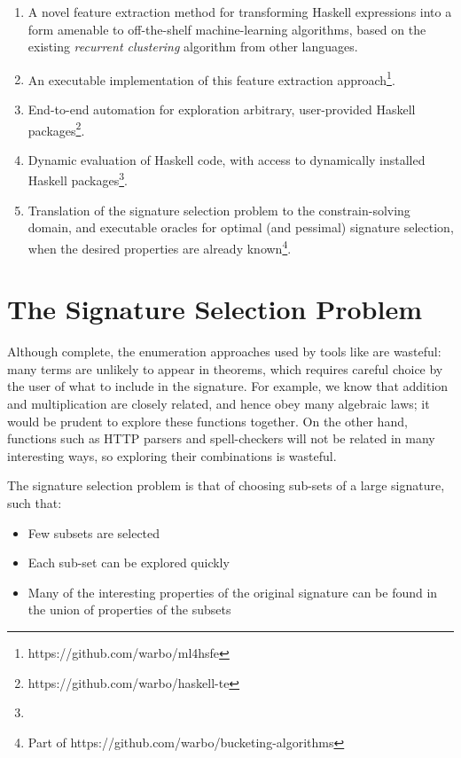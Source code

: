 \begin{enumerate}
\item A novel feature extraction method for transforming Haskell expressions
  into a form amenable to off-the-shelf machine-learning algorithms, based on
  the existing \emph{recurrent clustering} algorithm from other languages.
\item An executable implementation of this feature extraction
  approach\footnote{https://github.com/warbo/ml4hsfe}.
\item End-to-end automation for exploration arbitrary, user-provided Haskell
  packages\footnote{https://github.com/warbo/haskell-te}.
\item Dynamic evaluation of Haskell code, with access to dynamically installed
  Haskell packages\footnote{}.
\item Translation of the signature selection problem to the constrain-solving
  domain, and executable oracles for optimal (and pessimal) signature selection,
  when the desired properties are already known\footnote{Part of
    https://github.com/warbo/bucketing-algorithms}.
\end{enumerate}
\fi

\section{The Signature Selection Problem}
\label{sec:sigselect}

Although complete, the enumeration approaches used by tools like \quickspec{}
are wasteful: many terms are unlikely to appear in theorems, which requires
careful choice by the user of what to include in the signature. For example, we
know that addition and multiplication are closely related, and hence obey many
algebraic laws; it would be prudent to explore these functions together. On the
other hand, functions such as HTTP parsers and spell-checkers will not be
related in many interesting ways, so exploring their combinations is wasteful.

The signature selection problem is that of choosing sub-sets of a large
signature, such that:

\begin{itemize}
\item Few subsets are selected
\item Each sub-set can be explored quickly
\item Many of the interesting properties of the original signature can be
  found in the union of properties of the subsets
\end{itemize}

